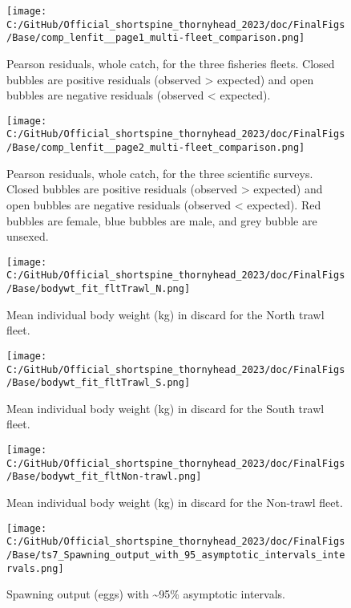 \documentclass[11pt,
  letterpaper,
]{article}
\begin{document}
\begin{figure}
\centering
\texttt{[image: C:/GitHub/Official\_shortspine\_thornyhead\_2023/doc/FinalFigs/Base/comp\_lenfit\_\_page1\_multi-fleet\_comparison.png]}
\caption{Pearson residuals, whole catch, for the three fisheries fleets. Closed bubbles are positive residuals (observed \textgreater{} expected) and open bubbles are negative residuals (observed \textless{} expected).\label{fig:resids_fisheries}}
\end{figure}

\begin{figure}
\centering
\texttt{[image: C:/GitHub/Official\_shortspine\_thornyhead\_2023/doc/FinalFigs/Base/comp\_lenfit\_\_page2\_multi-fleet\_comparison.png]}
\caption{Pearson residuals, whole catch, for the three scientific surveys. Closed bubbles are positive residuals (observed \textgreater{} expected) and open bubbles are negative residuals (observed \textless{} expected). Red bubbles are female, blue bubbles are male, and grey bubble are unsexed.\label{fig:resids_survey}}
\end{figure}

\begin{figure}
\centering
\texttt{[image: C:/GitHub/Official\_shortspine\_thornyhead\_2023/doc/FinalFigs/Base/bodywt\_fit\_fltTrawl\_N.png]}
\caption{Mean individual body weight (kg) in discard for the North trawl fleet.\label{fig:weightNorthTrl}}
\end{figure}

\begin{figure}
\centering
\texttt{[image: C:/GitHub/Official\_shortspine\_thornyhead\_2023/doc/FinalFigs/Base/bodywt\_fit\_fltTrawl\_S.png]}
\caption{Mean individual body weight (kg) in discard for the South trawl fleet.\label{fig:weightSouthTrl}}
\end{figure}

\begin{figure}
\centering
\texttt{[image: C:/GitHub/Official\_shortspine\_thornyhead\_2023/doc/FinalFigs/Base/bodywt\_fit\_fltNon-trawl.png]}
\caption{Mean individual body weight (kg) in discard for the Non-trawl fleet.\label{fig:weightNonTrl}}
\end{figure}

\begin{figure}
\centering
\texttt{[image: C:/GitHub/Official\_shortspine\_thornyhead\_2023/doc/FinalFigs/Base/ts7\_Spawning\_output\_with\_95\_asymptotic\_intervals\_intervals.png]}
\caption{Spawning output (eggs) with \sim 95\% asymptotic intervals.\label{fig:spawnout}}
\end{figure}
\end{document}
